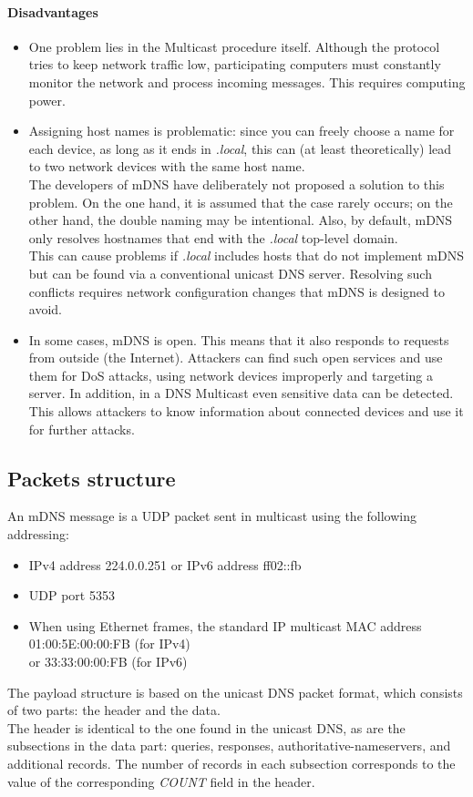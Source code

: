 \documentclass[fleqn, 10pt]{SelfArx} %
\begin{document}
\paragraph{Disadvantages} 
\begin{itemize}[leftmargin=*]
    \item One problem lies in the Multicast procedure itself. Although the protocol tries to keep network traffic low, participating computers must constantly monitor the network and process incoming messages. This requires computing power.
    \item Assigning host names is problematic: since you can freely choose a name for each device, as long as it ends in {\it{.local}}, this can (at least theoretically) lead to two network devices with the same host name.\\
          The developers of mDNS have deliberately not proposed a solution to this problem. On the one hand, it is assumed that the case rarely occurs; on the other hand, the double naming may be intentional. Also, by default, mDNS only resolves hostnames that end with the {\it{.local}} top-level domain. \\
          This can cause problems if {\it{.local}} includes hosts that do not implement mDNS but can be found via a conventional unicast DNS server. Resolving such conflicts requires network configuration changes that mDNS is designed to avoid.
    \item In some cases, mDNS is open. This means that it also responds to requests from outside (the Internet). Attackers can find such open services and use them for DoS attacks, using network devices improperly and targeting a server. In addition, in a DNS Multicast even sensitive data can be detected. 
	      This allows attackers to know information about connected devices and use it for further attacks.
\end{itemize}

\subsection{Packets structure}
An mDNS message is a UDP packet sent in multicast using the following addressing:
\begin{itemize}[leftmargin=*]
    \item IPv4 address 224.0.0.251 or IPv6 address ff02::fb
    \item UDP port 5353
    \item When using Ethernet frames, the standard IP multicast MAC address 01:00:5E:00:00:FB (for IPv4) \\or 33:33:00:00:FB (for IPv6)
\end{itemize}
The payload structure is based on the unicast DNS packet format, which consists of two parts: the header and the data.\\
The header is identical to the one found in the unicast DNS, as are the subsections in the data part: queries, responses, authoritative-nameservers, and additional records. The number of records in each subsection corresponds to the value of the corresponding {\it{COUNT}} field in the header.
\end{document}
